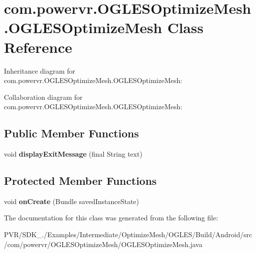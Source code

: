 \hypertarget{classcom_1_1powervr_1_1_o_g_l_e_s_optimize_mesh_1_1_o_g_l_e_s_optimize_mesh}{\section{com.\+powervr.\+O\+G\+L\+E\+S\+Optimize\+Mesh.\+O\+G\+L\+E\+S\+Optimize\+Mesh Class Reference}
\label{classcom_1_1powervr_1_1_o_g_l_e_s_optimize_mesh_1_1_o_g_l_e_s_optimize_mesh}
}


Inheritance diagram for com.\+powervr.\+O\+G\+L\+E\+S\+Optimize\+Mesh.\+O\+G\+L\+E\+S\+Optimize\+Mesh\+:


Collaboration diagram for com.\+powervr.\+O\+G\+L\+E\+S\+Optimize\+Mesh.\+O\+G\+L\+E\+S\+Optimize\+Mesh\+:
\subsection*{Public Member Functions}
\begin{DoxyCompactItemize}
\item 
\hypertarget{classcom_1_1powervr_1_1_o_g_l_e_s_optimize_mesh_1_1_o_g_l_e_s_optimize_mesh_a977f7a90637e061e174d1f1c91e3adda}{void {\bfseries display\+Exit\+Message} (final String text)}\label{classcom_1_1powervr_1_1_o_g_l_e_s_optimize_mesh_1_1_o_g_l_e_s_optimize_mesh_a977f7a90637e061e174d1f1c91e3adda}

\end{DoxyCompactItemize}
\subsection*{Protected Member Functions}
\begin{DoxyCompactItemize}
\item 
\hypertarget{classcom_1_1powervr_1_1_o_g_l_e_s_optimize_mesh_1_1_o_g_l_e_s_optimize_mesh_a1e3ce5d36ac8d3d9a297d995abce1dfc}{void {\bfseries on\+Create} (Bundle saved\+Instance\+State)}\label{classcom_1_1powervr_1_1_o_g_l_e_s_optimize_mesh_1_1_o_g_l_e_s_optimize_mesh_a1e3ce5d36ac8d3d9a297d995abce1dfc}

\end{DoxyCompactItemize}


The documentation for this class was generated from the following file\+:\begin{DoxyCompactItemize}
\item 
P\+V\+R/\+S\+D\+K\+\_./\+Examples/\+Intermediate/\+Optimize\+Mesh/\+O\+G\+L\+E\+S/\+Build/\+Android/src/com/powervr/\+O\+G\+L\+E\+S\+Optimize\+Mesh/O\+G\+L\+E\+S\+Optimize\+Mesh.\+java\end{DoxyCompactItemize}

